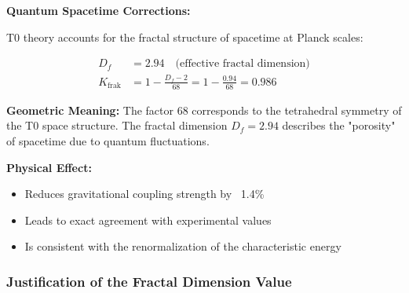 \documentclass[12pt,a4paper]{article}
\begin{document}
	\begin{derivation}
		\textbf{Quantum Spacetime Corrections:}
		
		T0 theory accounts for the fractal structure of spacetime at Planck scales:
		
		\begin{align}
			D_f &= 2.94 \quad \text{(effective fractal dimension)} \\
			K_{\text{frak}} &= 1 - \frac{D_f - 2}{68} = 1 - \frac{0.94}{68} = 0.986
		\end{align}
		
		\textbf{Geometric Meaning:} 
		The factor 68 corresponds to the tetrahedral symmetry of the T0 space structure. The fractal dimension $D_f = 2.94$ describes the "porosity" of spacetime due to quantum fluctuations.
		
		\textbf{Physical Effect:}
		\begin{itemize}
			\item Reduces gravitational coupling strength by ~1.4\%
			\item Leads to exact agreement with experimental values
			\item Is consistent with the renormalization of the characteristic energy
		\end{itemize}
	\end{derivation}
	
	\subsubsection{Justification of the Fractal Dimension Value}
	
\end{document}
